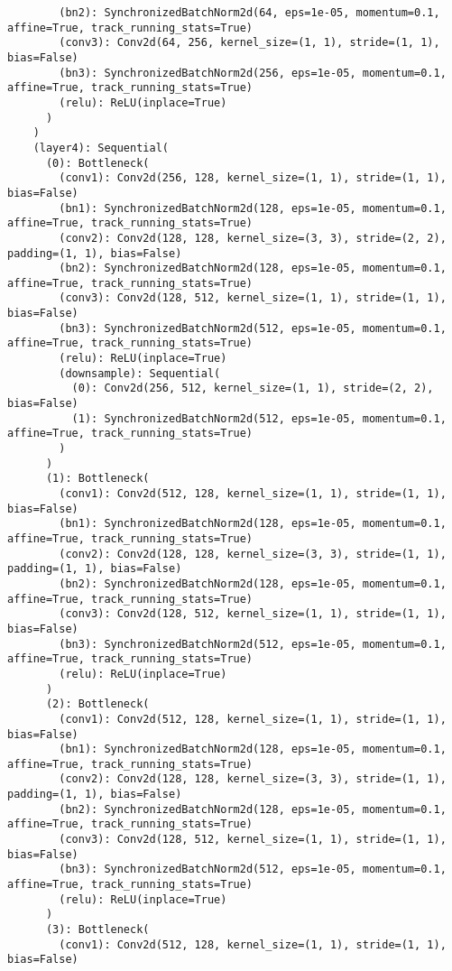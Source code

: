 \begin{verbatim}
        (bn2): SynchronizedBatchNorm2d(64, eps=1e-05, momentum=0.1, affine=True, track_running_stats=True)
        (conv3): Conv2d(64, 256, kernel_size=(1, 1), stride=(1, 1), bias=False)
        (bn3): SynchronizedBatchNorm2d(256, eps=1e-05, momentum=0.1, affine=True, track_running_stats=True)
        (relu): ReLU(inplace=True)
      )
    )
    (layer4): Sequential(
      (0): Bottleneck(
        (conv1): Conv2d(256, 128, kernel_size=(1, 1), stride=(1, 1), bias=False)
        (bn1): SynchronizedBatchNorm2d(128, eps=1e-05, momentum=0.1, affine=True, track_running_stats=True)
        (conv2): Conv2d(128, 128, kernel_size=(3, 3), stride=(2, 2), padding=(1, 1), bias=False)
        (bn2): SynchronizedBatchNorm2d(128, eps=1e-05, momentum=0.1, affine=True, track_running_stats=True)
        (conv3): Conv2d(128, 512, kernel_size=(1, 1), stride=(1, 1), bias=False)
        (bn3): SynchronizedBatchNorm2d(512, eps=1e-05, momentum=0.1, affine=True, track_running_stats=True)
        (relu): ReLU(inplace=True)
        (downsample): Sequential(
          (0): Conv2d(256, 512, kernel_size=(1, 1), stride=(2, 2), bias=False)
          (1): SynchronizedBatchNorm2d(512, eps=1e-05, momentum=0.1, affine=True, track_running_stats=True)
        )
      )
      (1): Bottleneck(
        (conv1): Conv2d(512, 128, kernel_size=(1, 1), stride=(1, 1), bias=False)
        (bn1): SynchronizedBatchNorm2d(128, eps=1e-05, momentum=0.1, affine=True, track_running_stats=True)
        (conv2): Conv2d(128, 128, kernel_size=(3, 3), stride=(1, 1), padding=(1, 1), bias=False)
        (bn2): SynchronizedBatchNorm2d(128, eps=1e-05, momentum=0.1, affine=True, track_running_stats=True)
        (conv3): Conv2d(128, 512, kernel_size=(1, 1), stride=(1, 1), bias=False)
        (bn3): SynchronizedBatchNorm2d(512, eps=1e-05, momentum=0.1, affine=True, track_running_stats=True)
        (relu): ReLU(inplace=True)
      )
      (2): Bottleneck(
        (conv1): Conv2d(512, 128, kernel_size=(1, 1), stride=(1, 1), bias=False)
        (bn1): SynchronizedBatchNorm2d(128, eps=1e-05, momentum=0.1, affine=True, track_running_stats=True)
        (conv2): Conv2d(128, 128, kernel_size=(3, 3), stride=(1, 1), padding=(1, 1), bias=False)
        (bn2): SynchronizedBatchNorm2d(128, eps=1e-05, momentum=0.1, affine=True, track_running_stats=True)
        (conv3): Conv2d(128, 512, kernel_size=(1, 1), stride=(1, 1), bias=False)
        (bn3): SynchronizedBatchNorm2d(512, eps=1e-05, momentum=0.1, affine=True, track_running_stats=True)
        (relu): ReLU(inplace=True)
      )
      (3): Bottleneck(
        (conv1): Conv2d(512, 128, kernel_size=(1, 1), stride=(1, 1), bias=False)

\end{verbatim}

